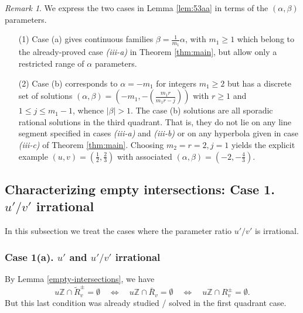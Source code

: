 \documentclass[12pt,letterpaper, reqno]{amsart}
\theoremstyle{definition}
\theoremstyle{remark}
\newtheorem{rmk}[thm]{Remark}
\newcommand{\ZZ}{\ensuremath{\mathbb{Z}}}
\newcommand{\uu}{{u'}}
\newcommand{\vv}{{v'}}
\begin{document}
\begin{rmk}\label{rem:54}
We express the two cases in Lemma \ref{lem:53aa} in terms of the $(\alpha, \beta)$ parameters.
\begin{enumerate}
\item[(1)]
Case (a) gives continuous families $\beta= \frac{1}{m_1} \alpha$, with $m_1 \ge 1$ 
which belong to the already-proved case {\it (iii-a)} in Theorem \ref{thm:main},
but allow only a restricted range of $\alpha$ parameters.
\item[(2)]
Case (b) corresponds to   $\alpha =-m_1$ for integers $m_1 \ge 2$ 
but has a discrete set of solutions $(\alpha, \beta) = (-m_1, - (\frac{m_1 r}{m_1 r -j}))$ with $r \ge 1$ and $1 \le j \le m_1-1$, 
whence  $|\beta| >1$.
The case (b) solutions are all sporadic rational solutions in the third quadrant. That is, they do not
lie on any line segment specified in cases {\it (iii-a)} and {\it (iii-b)} or on any hyperbola given in case {\it (iii-c)}
of Theorem \ref{thm:main}.
Choosing $m_2=r=2, j=1$ yields the explicit example $(u, v) = (\frac{1}{2}, \frac{2}{3})$
with associated $(\alpha, \beta) = (-2, -\frac{4}{3})$.
\end{enumerate}
\end{rmk}


%
%
\subsection{Characterizing empty intersections: Case 1. $\uu/\vv$ irrational}\label{sec:uv-irrational}

In this subsection we treat the cases where the parameter ratio $\uu/\vv$ is irrational. 
\subsubsection{Case 1(a). $\uu$ and $\uu/\vv$ irrational}\label{sec:both_irrational}
By Lemma \ref{empty-intersections}, we have
\[ u\ZZ\cap \widetilde{R}_{v}^\pm =\emptyset\quad\Leftrightarrow\quad u\ZZ\cap \bar{R}_v = \emptyset \quad\Leftrightarrow\quad u\ZZ\cap R_v^\pm=\emptyset.\]
But this last condition was already studied / solved in the first quadrant case.
\end{document}
